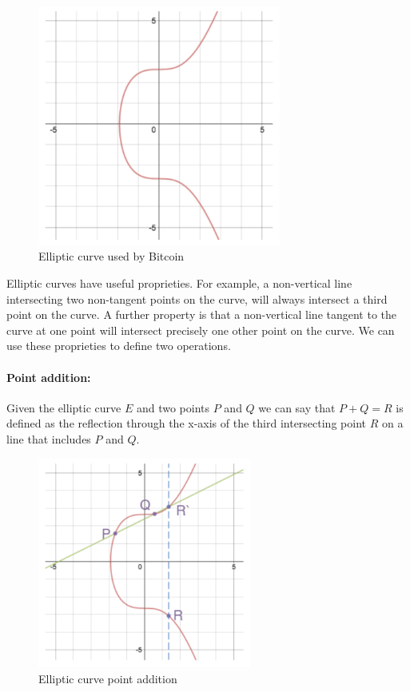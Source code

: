 \documentclass{article}
\begin{document}
\begin{figure}[H]
    \centering
    \includegraphics[width=8cm]{images/2.png}
    \caption{Elliptic curve used by Bitcoin}
\end{figure}

\noindent Elliptic curves have useful proprieties. For example, a non-vertical line intersecting two non-tangent points on the curve, will always intersect a third point on the curve. A further property is that a non-vertical line tangent to the curve at one point will intersect precisely one other point on the curve.\newline
We can use these proprieties to define two operations.\newline
\paragraph{Point addition:} Given the elliptic curve \(E\) and two points \(P\) and \(Q\) we can say that \(P + Q = R\) is defined as the reflection through the x-axis of the third intersecting point \(R\) on a line that includes \(P\) and \(Q\).

\begin{figure}[H]
    \centering
    \includegraphics[width=7cm]{images/3.png}
    \caption{Elliptic curve point addition}
\end{figure}
\end{document}
